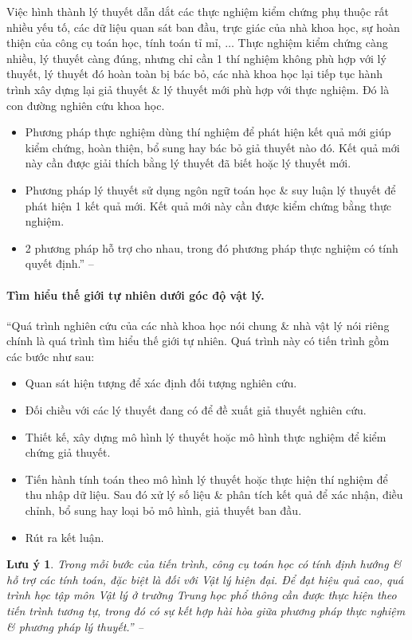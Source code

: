 \documentclass[oneside]{book}
\numberwithin{equation}{section}
\newtheorem{luuy}{Lưu ý}[section]
\begin{document}
Việc hình thành lý thuyết dẫn dắt các thực nghiệm kiểm chứng phụ thuộc rất nhiều yếu tố, các dữ liệu quan sát ban đầu, trực giác của nhà khoa học, sự hoàn thiện của công cụ toán học, tính toán tỉ mỉ, $\ldots$ Thực nghiệm kiểm chứng càng nhiều, lý thuyết càng đúng, nhưng chỉ cần 1 thí nghiệm không phù hợp với lý thuyết, lý thuyết đó hoàn toàn bị bác bỏ, các nhà khoa học lại tiếp tục hành trình xây dựng lại giả thuyết \& lý thuyết mới phù hợp với thực nghiệm. Đó là con đường nghiên cứu khoa học.
\begin{itemize}
	\item Phương pháp thực nghiệm dùng thí nghiệm để phát hiện kết quả mới giúp kiểm chứng, hoàn thiện, bổ sung hay bác bỏ giả thuyết nào đó. Kết quả mới này cần được giải thích bằng lý thuyết đã biết hoặc lý thuyết mới.
	\item Phương pháp lý thuyết sử dụng ngôn ngữ toán học \& suy luận lý thuyết để phát hiện 1 kết quả mới. Kết quả mới này cần được kiểm chứng bằng thực nghiệm.
	\item 2 phương pháp hỗ trợ cho nhau, trong đó phương pháp thực nghiệm có tính quyết định.'' -- \cite[pp. 7--8]{SGK_Vat_Ly_10_Chan_Troi_Sang_Tao}
\end{itemize}

\paragraph{Tìm hiểu thế giới tự nhiên dưới góc độ vật lý.}
``Quá trình nghiên cứu của các nhà khoa học nói chung \& nhà vật lý nói riêng chính là quá trình tìm hiểu thế giới tự nhiên. Quá trình này có tiến trình gồm các bước như sau:
\begin{itemize}
	\item Quan sát hiện tượng để xác định đối tượng nghiên cứu.
	\item Đối chiều với các lý thuyết đang có để đề xuất giả thuyết nghiên cứu.
	\item Thiết kế, xây dựng mô hình lý thuyết hoặc mô hình thực nghiệm để kiểm chứng giả thuyết.
	\item Tiến hành tính toán theo mô hình lý thuyết hoặc thực hiện thí nghiệm để thu nhập dữ liệu. Sau đó xử lý số liệu \& phân tích kết quả để xác nhận, điều chỉnh, bổ sung hay loại bỏ mô hình, giả thuyết ban đầu.
	\item Rút ra kết luận.
\end{itemize}

\begin{luuy}
	Trong mỗi bước của tiến trình, công cụ toán học có tính định hướng \& hỗ trợ các tính toán, đặc biệt là đối với Vật lý hiện đại. Để đạt hiệu quả cao, quá trình học tập môn Vật lý ở trường Trung học phổ thông cần được thực hiện theo tiến trình tương tự, trong đó có sự kết hợp hài hòa giữa phương pháp thực nghiệm \& phương pháp lý thuyết.'' -- \cite[p. 9]{SGK_Vat_Ly_10_Chan_Troi_Sang_Tao}
\end{luuy}
\end{document}
